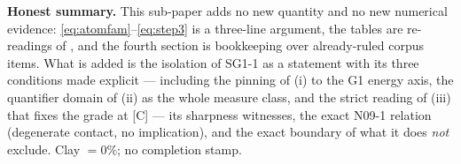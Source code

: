 \documentclass[11pt]{article}
\theoremstyle{definition}
\theoremstyle{remark}
\newcommand{\code}[1]{\texttt{\footnotesize\detokenize{#1}}}
\newcommand{\grC}{\textsf{[C]}}
\begin{document}
\medskip
\noindent\textbf{Honest summary.} This sub-paper adds no new quantity and no new
numerical evidence: \eqref{eq:atomfam}--\eqref{eq:step3} is a three-line
argument, the tables are re-readings of \code{sg1_G.log}, and the fourth
section is bookkeeping over already-ruled corpus items. What is added is the
isolation of SG1-1 as a statement with its three conditions made explicit ---
including the pinning of (i) to the G1 energy axis, the quantifier domain of
(ii) as the whole measure class, and the strict reading of (iii) that fixes the
grade at \grC{} --- its sharpness witnesses, the exact N09-1 relation (degenerate
contact, no implication), and the exact boundary of what it does \emph{not}
exclude. Clay $=0\%$; no completion stamp.
\end{document}
